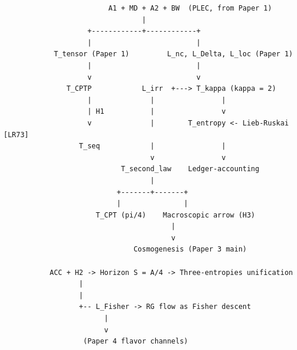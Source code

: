 \documentclass[11pt]{article}
\theoremstyle{remark}
\begin{document}
\begin{center}
\small
\begin{verbatim}
                         A1 + MD + A2 + BW  (PLEC, from Paper 1)
                                 |
                    +------------+------------+
                    |                         |
            T_tensor (Paper 1)         L_nc, L_Delta, L_loc (Paper 1)
                    |                         |
                    v                         v
               T_CPTP            L_irr  +---> T_kappa (kappa = 2)
                    |              |                |
                    | H1           |                v
                    v              |        T_entropy <- Lieb-Ruskai [LR73]
                  T_seq            |                |
                                   v                v
                            T_second_law    Ledger-accounting
                                   |
                           +-------+-------+
                           |               |
                      T_CPT (pi/4)    Macroscopic arrow (H3)
                                        |
                                        v
                               Cosmogenesis (Paper 3 main)

           ACC + H2 -> Horizon S = A/4 -> Three-entropies unification
                  |
                  |
                  +-- L_Fisher -> RG flow as Fisher descent
                        |
                        v
                   (Paper 4 flavor channels)
\end{verbatim}
\end{center}
\end{document}
